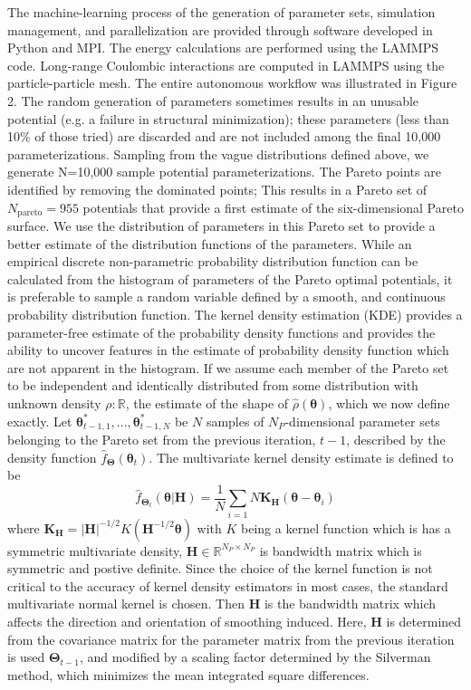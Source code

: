 The machine-learning process of the generation of parameter sets, simulation management, and parallelization are provided through software developed in Python and MPI. The energy calculations are performed using the LAMMPS\cite{plimpton1995_lammps} code. Long-range Coulombic interactions are computed in LAMMPS using the particle-particle mesh\cite{hockney1988_ppm}.  The entire autonomous workflow was illustrated in Figure 2. The random generation of parameters sometimes results in an unusable potential (e.g. a failure in structural minimization); these parameters (less than 10\% of those tried) are discarded and are not included among the final 10,000 parameterizations.
Sampling from the vague distributions defined above, we generate N=10,000 sample potential parameterizations. The Pareto points are identified by removing the dominated points; This results in a Pareto set of  $N_\text{pareto} = 955$ potentials that provide a first estimate of the six-dimensional Pareto surface. We use the distribution of parameters in this Pareto set to provide a better estimate of the distribution functions of the parameters.  While an empirical discrete non-parametric probability distribution function can be calculated from the histogram of parameters of the Pareto optimal potentials, it is preferable to sample a random variable defined by a smooth, and continuous probability distribution function. The kernel density estimation (KDE) provides a parameter-free estimate of the probability density functions\cite{rosenblatt1956_kde,parzen1962_kde} and provides the ability to uncover features in the estimate of probability density function which are not apparent in the histogram. If we assume each member of the Pareto set to be independent and identically distributed from some distribution with unknown density $\rho:\mathbb{R}$, the estimate of the shape of $\hat{\rho}(\bm{\theta})$, which we now define exactly.
Let $\bm{\theta}_{t-1,1}^*,...,\bm{\theta}_{t-1,N}^*$ be $N$ samples of $N_P$-dimensional parameter sets belonging to the Pareto set from the previous iteration, $t-1$, described by the density function $\hat{f}_{\bm{\Theta}}(\bm{\theta}_t)$.  The multivariate kernel density estimate is defined to be
\begin{equation}
	\hat{f}_{\bm{\Theta}_t}(\bm{\theta}|\bm{H})
			= \frac{1}{N}\sum_{i=1}{N}\bm{K}_{\bm{H}}(\bm{\theta}-\bm{\theta}_i)
\end{equation}
where $\bm{K}_{\bm{H}} = |\bm{H}|^{-1/2} K ({\bm{H}}^{-1/2}\bm{\theta})$ with $K$ being a kernel function which is has a symmetric multivariate density, $\bm{H}\in \mathbb{R}^{N_P\times N_P}$ is bandwidth matrix which is symmetric and postive definite.  Since the choice of the kernel function is not critical to the accuracy of kernel density estimators in most cases\cite{wand1995_kde}, the standard multivariate normal kernel is chosen.  Then $\bm{H}$ is the bandwidth matrix which affects the direction and orientation of smoothing induced.
Here, $\bm{H}$ is determined from the covariance matrix for the parameter matrix from the previous iteration is used $\bm{\Theta}_{t-1}$, and modified by a scaling factor determined by the Silverman method\cite{silverman1998_kde}, which minimizes the mean integrated square differences.

